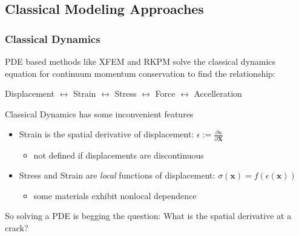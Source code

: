 \documentclass{beamer}
\begin{document}
\subsection{Classical Modeling Approaches}
%
\begin{frame}
  \frametitle{Classical Dynamics}
  \begin{center}
     PDE based methods like XFEM and RKPM solve the classical dynamics equation for continuum momentum conservation to find the relationship:\vspace{0.3cm}
    
    Displacement \(\leftrightarrow\) Strain \(\leftrightarrow\) Stress \(\leftrightarrow\) Force \(\leftrightarrow\) Accelleration
  \end{center}
	
  Classical Dynamics has some inconvenient features
  \begin{itemize}
    \item Strain is the spatial derivative of displacement: \(\epsilon := \frac{\partial u}{\partial \mathbf{X}} \)
    \begin{itemize}
      \item not defined if displacements are discontinuous
    \end{itemize}
    \item Stress and Strain are \textit{local} functions of displacement: \(\sigma(\mathbf{x}) = f( \epsilon(\mathbf{x}))\)
    \begin{itemize}
      \item some materials exhibit nonlocal dependence
    \end{itemize}
  \end{itemize}
  
  So solving a PDE is begging the question: What is the spatial derivative at a crack?
  
\end{frame}
%
%
\end{document}
